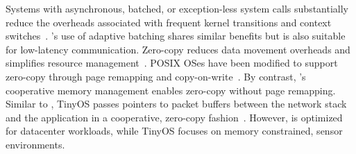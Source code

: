 \begin{comment}
  \myparagraph{User-level networking stacks:} User-level network
  stacks~\cite{jeong2014mtcp, sandstorm, openonload} can outperform
  kernel-based implementations through specialization and elimination
  of redundant layers and abstractions, but trade-off performance for
  a weaker security model.  The \ix dataplane demonstrates that a
  specialized networking stack can offer performance and cooperate
  with applications without having to weaken security and isolation
  properties.
 
  \myparagraph{Hardware and protocol specialization:} Applications can
  use a connection-less UDP-based protocol for
  scalability~\cite{DBLP:conf/nsdi/NishtalaFGKLLMPPSSTV13}.
  Latency-sensitive datacenter applications can use specialized
  Infiniband adapters to expose RDMA with $1-3$\microsecond latencies
  to
  applications~\cite{dragojevic14farm,DBLP:conf/icpp/JoseSLZHWIOWSP11,
    mitchell:rdma, DBLP:conf/sosp/OngaroRSOR11}.  Specialized FGPAs
  can replace conventional servers for important applications such as
  memcached~\cite{DBLP:conf/hotcloud/BlottKLVBI13,DBLP:conf/fpga/ChalamalasettiLWARM13,HPHA:Tanaka:2014}.
  \ix is designed to allow TCP/IP to scale with architectural trends
  by eliminating kernel bottlenecks.
\end{comment}


 Systems with
asynchronous, batched, or exception-less system calls substantially
reduce the overheads associated with frequent kernel transitions and
context
switches~\cite{DBLP:conf/osdi/HanMCR12,jeong2014mtcp,DBLP:journals/cacm/Rizzo12,DBLP:conf/osdi/SoaresS10}. \ix's
use of adaptive batching shares similar benefits but is also suitable
for low-latency communication.  Zero-copy reduces data movement
overheads and simplifies resource
management~\cite{DBLP:journals/tocs/PaiDZ00}. POSIX OSes have been
modified to support zero-copy through page remapping and
copy-on-write~\cite{DBLP:conf/usenix/Chu96}. By contrast, \ix's
cooperative memory management enables zero-copy without page
remapping. Similar to \ix, TinyOS passes pointers to packet buffers
between the network stack and the application in a cooperative,
zero-copy fashion~\cite{tinyosnet}.
However, \ix is optimized for datacenter
workloads, while TinyOS focuses on memory constrained, sensor
environments.

